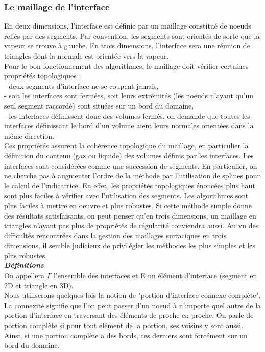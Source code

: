 \subsubsection{Le maillage de l'interface}
En deux dimensions, l'interface est d\'efinie par un maillage constitu\'e de noeuds reli\'es par des segments. Par convention, les segments sont orient\'es de sorte que la vapeur se trouve \`a gauche. En trois dimensions, l'interface sera une r\'eunion de triangles dont la normale est orient\'ee vers la vapeur.\\
Pour le bon fonctionnement des algorithmes, le maillage doit v\'erifier certaines propri\'et\'es topologiques :\\
- deux segments d'interface ne se coupent jamais,\\
- soit les interfaces sont ferm\'ees, soit leurs extr\'emit\'es (les noeuds n'ayant qu'un seul segment raccord\'e) sont situ\'ees sur un bord du domaine,\\
- les interfaces d\'efinissent donc des volumes ferm\'es, on demande que toutes les interfaces d\'efinissant le bord d'un volume aient leurs normales orient\'ees dans la m\^eme direction.\\
Ces propri\'et\'es assurent la coh\'erence topologique du maillage, en particulier la d\'efinition du contenu (gaz ou liquide) des volumes d\'efinis par les interfaces. Les interfaces sont consid\'er\'ees comme une succession de
segments. En particulier, on ne cherche pas \`a augmenter l'ordre de la m\'ethode par l'utilisation de splines pour le calcul de l'indicatrice. En effet, les propri\'et\'es topologiques \'enonc\'ees plus haut sont plus faciles \`a v\'erifier avec l'utilisation des segments. Les algorithmes sont plus faciles à mettre en oeuvre et plus robustes. Si cette m\'ethode simple donne des r\'esultats satisfaisants, on peut penser qu'en trois dimensions, un maillage en triangles n'ayant pas plus de propri\'et\'es de r\'egularit\'e conviendra aussi. Au vu des difficult\'es rencontr\'ees dans la gestion des maillages surfaciques en trois dimensions, il semble judicieux de privil\'egier les m\'ethodes les plus simples et les plus robustes.
\smallskip \\

\textit{\textbf{D\'efinitions}}
\smallskip \\

On appellera $\Gamma$ l'ensemble des interfaces et E un \'el\'ement d'interface (segment en 2D et triangle en 3D).\\
Nous utiliserons quelques fois la notion de "portion d'interface connexe complète". La connexit\'e signifie que l'on peut passer d'un noeud \`a n'importe quel autre de la portion d'interface en traversant des \'el\'ements de proche en proche. On parle de portion compl\`ete si pour tout \'el\'ement de la portion, ses voisins y sont aussi. Ainsi, si une portion compl\`ete a des bords, ces derniers sont forc\'ement sur un bord du domaine.

